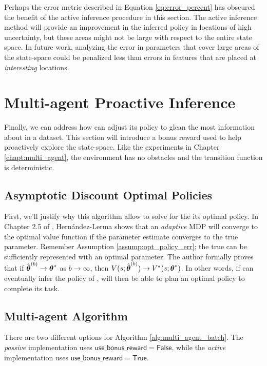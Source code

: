 Perhaps the error metric described in Equation \ref{eq:error_percent} has obscured the benefit of the active inference
procedure in this section. The active inference method will provide an improvement in the inferred policy in locations
of high uncertainty, but these areas might not be large with respect to the entire state space. In future work,
analyzing the error in parameters that cover large areas of the state-space could be penalized less than errors in
features that are placed at \emph{interesting} locations.

\section{Multi-agent Proactive Inference}

Finally, we can address how  can adjust its policy to glean the most information about  in a dataset.
This section will introduce a bonus reward used to help  proactively explore the state-space. Like the
experiments in Chapter \ref{chapt:multi_agent}, the environment has no obstacles and the transition function is
deterministic.

\subsection{Asymptotic Discount Optimal Policies}\label{sec:ADO_policy}

First, we'll justify why this algorithm allow  to solve for the its optimal policy. In Chapter 2.5 of
\cite{hernandez2012adaptive}, Hern\'andez-Lerma shows that an \textit{adaptive}  \ac{MDP} will converge to the optimal
value function if the parameter estimate converges to the true parameter. Remember Assumption
\ref{assump:opt_policy_err}; the true  can be sufficiently represented with an optimal parameter.  The author
formally proves that if $\hat{\boldsymbol{\mathbb{\theta}}}^{(b)} \rightarrow \boldsymbol{\mathbb{\theta}}^*$ as $b \rightarrow \infty$, then
$V(s;\hat{\boldsymbol{\mathbb{\theta}}}^{(b)}) \rightarrow V^*(s;\boldsymbol{\mathbb{\theta}}^*)$. In other words, if  can
eventually infer the policy of ,  will then be able to plan an optimal policy to complete its task.

\subsection{Multi-agent Algorithm}
There are two different options for Algorithm \ref{alg:multi_agent_batch}. The \emph{passive} implementation uses
$\mathsf{use\_bonus\_reward}=\mathsf{False}$, while the \emph{active} implementation uses
$\mathsf{use\_bonus\_reward}=\mathsf{True}$.

